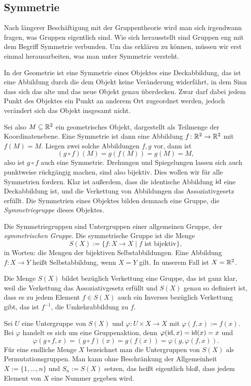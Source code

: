 \subsection{Symmetrie}

Nach längerer Beschäftigung mit der Gruppentheorie wird man sich
irgendwann fragen, was Gruppen eigentlich sind. Wie sich herausstellt
sind Gruppen eng mit dem Begriff Symmetrie verbunden. Um das erklären
zu können, müssen wir erst einmal herausarbeiten, was man unter
Symmetrie versteht.

In der Geometrie ist eine Symmetrie eines Objektes eine Deckabbildung,
das ist eine Abbildung durch die dem Objekt keine Veränderung
widerfährt, in dem Sinn dass sich das alte und das neue Objekt
genau überdecken. Zwar darf dabei jedem Punkt des Objektes ein
Punkt an anderem Ort zugeordnet werden, jedoch verändert sich das
Objekt insgesamt nicht.

Sei also $M\subseteq\mathbb R^2$ ein geometrisches Objekt, dargestellt als
Teilmenge der Koordinatenebene. Eine Symmetrie ist dann eine
Abbildung $f\colon\mathbb R^2\to\mathbb R^2$ mit $f(M)=M$. Liegen zwei solche
Abbildungen $f,g$ vor, dann ist
\[(g\circ f)(M) = g(f(M)) = g(M) = M,\]
also ist $g\circ f$ auch eine Symmetrie. Drehungen und Spiegelungen
lassen sich auch punktweise rückgängig machen, sind also bijektiv.
Dies wollen wir für alle Symmetrien fordern. Klar ist außerdem,
dass die identische Abbildung $\operatorname{id}$ eine Deckabbildung ist, und
die Verkettung von Abbildungen das Assoziativgesetz erfüllt.
Die Symmetrien eines Objektes bilden demnach eine Gruppe, die
\emph{Symmetriegruppe} dieses Objektes.

Die Symmetriegruppen sind Untergruppen einer allgemeinen Gruppe,
der \emph{symmetrischen Gruppe}. Die symmetrische Gruppe ist
die Menge
\[S(X) := \{f\colon X\to X\mid \text{$f$ ist bijektiv}\},\]
in Worten: die Mengen der bijektiven Selbstabbildungen. Eine
Abbildung $f\colon X\to Y$ heißt Selbstabbildung, wenn $X=Y$ gilt.
In unserem Fall ist $X=\mathbb R^2$.

Die Menge $S(X)$ bildet bezüglich Verkettung eine Gruppe, das ist
ganz klar, weil die Verkettung das Assoziativgesetz erfüllt und
$S(X)$ genau so definiert ist, dass es zu jedem Element $f\in S(X)$
auch ein Inverses bezüglich Verkettung gibt, das ist $f^{-1}$,
die Umkehrabbildung zu $f$.

Sei $U$ eine Untergruppe von $S(X)$ und $\varphi\colon U\times X\to X$
mit $\varphi(f,x):=f(x)$. Bei $\varphi$ handelt es sich um eine
Gruppenaktion, denn $\varphi(\operatorname{id},x)=\operatorname{id}(x)=x$ und
\[\varphi(g\circ f,x) = (g\circ f)(x) = g(f(x))
= \varphi(g,\varphi(f,x)).\]
Für eine endliche Menge $X$ bezeichnet man die Untergruppen von
$S(X)$ als Permutationsgruppen. Man kann ohne Beschränkung der
Allgemeinheit $X:=\{1,\ldots,n\}$ und $S_n:=S(X)$ setzen, das
heißt eigentlich bloß, dass jedem Element von $X$ eine Nummer
gegeben wird.

